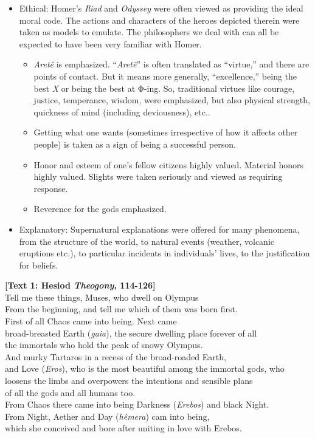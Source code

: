\documentclass[11pt]{article}
\newcommand{\gk}[1]{\textgreek{#1}}
\begin{document}
\begin{itemize}

\item{Ethical: Homer's \emph{Iliad} and \emph{Odyssey} were often viewed as providing the ideal moral code. The actions and characters of the heroes depicted therein were taken as models to emulate. The philosophers we deal with can all be expected to have been very familiar with Homer.}\begin{itemize}\item{\emph{Aret\^{e}} is emphasized. ``\emph{Aret\^{e}}'' is often translated as ``virtue,'' and there are points of contact. But it means more generally, ``excellence,'' being the best \emph{X} or being the best at \gk{Φ}-ing. So, traditional virtues like courage, justice, temperance, wisdom, were emphasized, but also physical strength, quickness of mind (including deviousness), etc..}\item{Getting what one wants (sometimes irrespective of how it affects other people) is taken as a sign of being a successful person.}\item{Honor and esteem of one's fellow citizens highly valued. Material honors highly valued. Slights were taken seriously and viewed as requiring response.}\item{Reverence for the gods emphasized.}\end{itemize}

\item{Explanatory: Supernatural explanations were offered for many phenomena, from the structure of the world, to natural events (weather, volcanic eruptions etc.), to particular incidents in individuals' lives, to the justification for beliefs.}\end{itemize}

\noindent \textbf{[Text 1: Hesiod \emph{Theogony}, 114-126]}\\Tell me these things, Muses, who dwell on Olympus\\From the beginning, and tell me which of them was born first.\\First of all Chaos came into being. Next came\\broad-breasted Earth (\emph{gaia}), the secure dwelling place forever of all\\the immortals who hold the peak of snowy Olympus.\\And murky Tartaros in a recess of the broad-roaded Earth,\\and Love (\emph{Eros}), who is the most beautiful among the immortal gods, who\\loosens the limbs and overpowers the intentions and sensible plans\\of all the gods and all humans too.\\From Chaos there came into being Darkness (\emph{Erebos}) and black Night.\\From Night, Aether and Day (\emph{h\^{e}mera}) cam into being,\\which she conceived and bore after uniting in love with Erebos.\\
\end{document}
